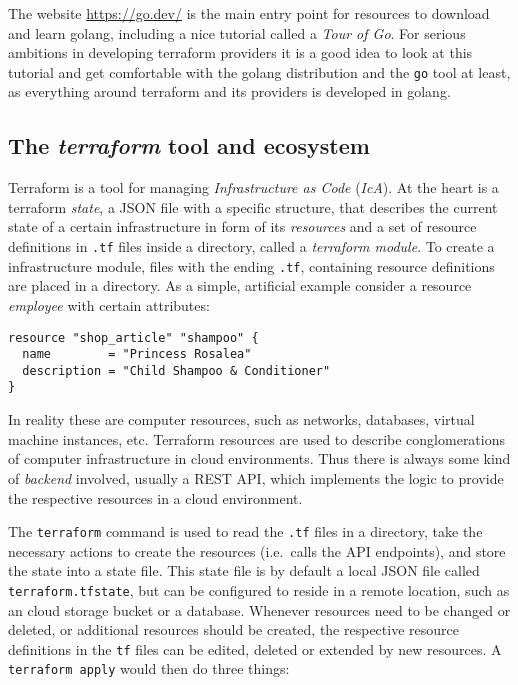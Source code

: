\documentclass[paper=a4,11pt,numbers=noenddot]{article}
\begin{document}
The website \url{https://go.dev/} is the main entry point for resources to download and learn golang, including a nice tutorial called a \emph{Tour of Go}. For serious ambitions in developing terraform providers it is a good idea to look at this tutorial and get comfortable with the golang distribution and the \verb'go' tool at least, as everything around terraform and its providers is developed in golang.

\subsection{The \emph{terraform} tool and ecosystem}
\label{subsec:terr-tool-ecosyst}

Terraform is a tool for managing \emph{Infrastructure as Code} (\emph{IcA}). At the heart is a terraform \emph{state}, a JSON file with a specific structure, that describes the current state of a certain infrastructure in form of its \emph{resources} and a set of resource definitions in \verb'.tf' files inside a directory, called a \emph{terraform module}. To create a infrastructure module, files with the ending \verb'.tf', containing resource definitions are placed in a directory. As a simple, artificial example consider a resource \emph{employee} with certain attributes:

\begin{lstlisting}
resource "shop_article" "shampoo" {
  name        = "Princess Rosalea"
  description = "Child Shampoo & Conditioner"
}
\end{lstlisting}

In reality these are computer resources, such as networks, databases, virtual machine instances, etc. Terraform resources are used to describe conglomerations of computer infrastructure in cloud environments. Thus there is always some kind of \emph{backend} involved, usually a REST API, which implements the logic to provide the respective resources in a cloud environment.

The \verb'terraform' command is used to read the \verb'.tf' files in a directory, take the necessary actions to create the resources (i.e.\ calls the API endpoints), and store the state into a state file. This state file is by default a local JSON file called \verb'terraform.tfstate', but can be configured to reside in a remote location, such as an cloud storage bucket or a database. Whenever resources need to be changed or deleted, or additional resources should be created, the respective resource definitions in the \verb'tf' files can be edited, deleted or extended by new resources. A \verb'terraform apply' would then do three things:
\end{document}
